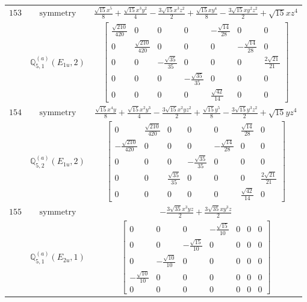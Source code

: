 \documentclass[fleqn,8pt,landscape]{jsarticle}
\begin{document}
\begin{longtable}{ccc}
$ 153 $ & $ \text{symmetry} $ & $ \frac{\sqrt{15} x^{5}}{8} + \frac{\sqrt{15} x^{3} y^{2}}{4} - \frac{3 \sqrt{15} x^{3} z^{2}}{2} + \frac{\sqrt{15} x y^{4}}{8} - \frac{3 \sqrt{15} x y^{2} z^{2}}{2} + \sqrt{15} x z^{4} $ \\
$  $ & $ \mathbb{Q}_{5,1}^{(a)}(E_{1u},2) $ & $ \begin{bmatrix} \frac{\sqrt{210}}{420} & 0 & 0 & 0 & - \frac{\sqrt{14}}{28} & 0 & 0 \\ 0 & \frac{\sqrt{210}}{420} & 0 & 0 & 0 & - \frac{\sqrt{14}}{28} & 0 \\ 0 & 0 & - \frac{\sqrt{35}}{35} & 0 & 0 & 0 & \frac{2 \sqrt{21}}{21} \\ 0 & 0 & 0 & - \frac{\sqrt{35}}{35} & 0 & 0 & 0 \\ 0 & 0 & 0 & 0 & \frac{\sqrt{42}}{14} & 0 & 0 \end{bmatrix} $ \\ \hline
$ 154 $ & $ \text{symmetry} $ & $ \frac{\sqrt{15} x^{4} y}{8} + \frac{\sqrt{15} x^{2} y^{3}}{4} - \frac{3 \sqrt{15} x^{2} y z^{2}}{2} + \frac{\sqrt{15} y^{5}}{8} - \frac{3 \sqrt{15} y^{3} z^{2}}{2} + \sqrt{15} y z^{4} $ \\
$  $ & $ \mathbb{Q}_{5,2}^{(a)}(E_{1u},2) $ & $ \begin{bmatrix} 0 & \frac{\sqrt{210}}{420} & 0 & 0 & 0 & \frac{\sqrt{14}}{28} & 0 \\ - \frac{\sqrt{210}}{420} & 0 & 0 & 0 & - \frac{\sqrt{14}}{28} & 0 & 0 \\ 0 & 0 & 0 & - \frac{\sqrt{35}}{35} & 0 & 0 & 0 \\ 0 & 0 & \frac{\sqrt{35}}{35} & 0 & 0 & 0 & \frac{2 \sqrt{21}}{21} \\ 0 & 0 & 0 & 0 & 0 & \frac{\sqrt{42}}{14} & 0 \end{bmatrix} $ \\ \hline
$ 155 $ & $ \text{symmetry} $ & $ - \frac{3 \sqrt{35} x^{3} y z}{2} + \frac{3 \sqrt{35} x y^{3} z}{2} $ \\
$  $ & $ \mathbb{Q}_{5,1}^{(a)}(E_{2u},1) $ & $ \begin{bmatrix} 0 & 0 & 0 & - \frac{\sqrt{15}}{10} & 0 & 0 & 0 \\ 0 & 0 & - \frac{\sqrt{15}}{10} & 0 & 0 & 0 & 0 \\ 0 & - \frac{\sqrt{10}}{10} & 0 & 0 & 0 & 0 & 0 \\ - \frac{\sqrt{10}}{10} & 0 & 0 & 0 & 0 & 0 & 0 \\ 0 & 0 & 0 & 0 & 0 & 0 & 0 \end{bmatrix} $ \\ \hline

\end{longtable}
\end{document}
